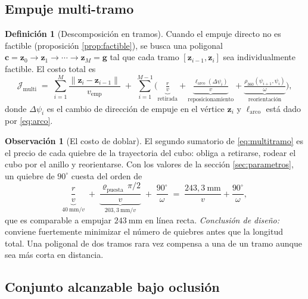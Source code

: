 \documentclass[11pt,a4paper]{article}
\theoremstyle{definition}
\newtheorem{definicion}[teorema]{Definición}
\newtheorem{observacion}[teorema]{Observación}
\newcommand{\cc}{\mathbf{c}}
\newcommand{\gv}{\mathbf{g}}
\newcommand{\grados}{^{\circ}}
\begin{document}
\subsection{Empuje multi-tramo}
\label{sec:multitramo}

\begin{definicion}[Descomposición en tramos]
Cuando el empuje directo no es factible (proposición \ref{prop:factible}), se busca una
poligonal $\cc = \mathbf z_0 \to \mathbf z_1 \to \cdots \to \mathbf z_M = \gv$ tal que
cada tramo $[\mathbf z_{i-1}, \mathbf z_i]$ sea individualmente factible. El costo total
es
\begin{equation}
  \mathcal J_{\mathrm{multi}}
  \;=\; \sum_{i=1}^{M} \frac{\|\mathbf z_i - \mathbf z_{i-1}\|}{v_{\mathrm{emp}}}
  \;+\; \sum_{i=1}^{M-1} \Big(\underbrace{\tfrac{r}{v}}_{\text{retirada}}
  + \underbrace{\tfrac{\ell_{\mathrm{arco}}(\Delta\psi_i)}{v}}_{\text{reposicionamiento}}
  + \underbrace{\tfrac{\rho_{360}(\psi_{i+1},\psi_i)}{\omega}}_{\text{reorientación}}\Big),
  \label{eq:multitramo}
\end{equation}
donde $\Delta\psi_i$ es el cambio de dirección de empuje en el vértice $\mathbf z_i$ y
$\ell_{\mathrm{arco}}$ está dado por \eqref{eq:arco}.
\end{definicion}

\begin{observacion}[El costo de doblar]
El segundo sumatorio de \eqref{eq:multitramo} es el precio de cada quiebre de la
trayectoria del cubo: obliga a retirarse, rodear el cubo por el anillo y reorientarse.
Con los valores de la sección \ref{sec:parametros}, un quiebre de $90\grados$ cuesta del
orden de
\[
  \underbrace{\frac{r}{v}}_{40\ \mathrm{mm}/v}
  \;+\; \underbrace{\frac{\varrho_{\mathrm{puesta}}\,\pi/2}{v}}_{203{,}3\ \mathrm{mm}/v}
  \;+\; \frac{90\grados}{\omega}
  \;=\; \frac{243{,}3\ \mathrm{mm}}{v} + \frac{90\grados}{\omega},
\]
que es comparable a empujar $243\ \mathrm{mm}$ en línea recta. \emph{Conclusión de
diseño:} conviene fuertemente minimizar el número de quiebres antes que la longitud
total. Una poligonal de dos tramos rara vez compensa a una de un tramo aunque sea más
corta en distancia.
\end{observacion}

\subsection{Conjunto alcanzable bajo oclusión}
\label{sec:alcanzable}
\end{document}
